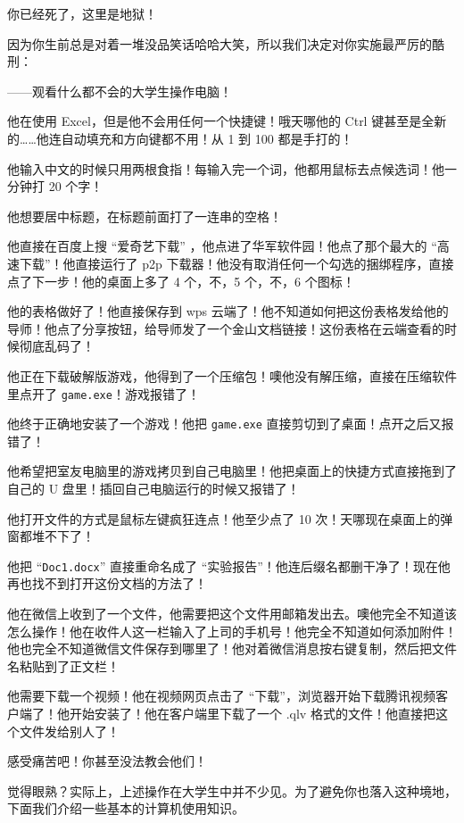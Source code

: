 \begin{tcolorbox}[title={作为引入的笑话}, enhanced, breakable, fontupper=\small,before upper={\setlength{\parindent}{2em}}]
  你已经死了，这里是地狱！

因为你生前总是对着一堆没品笑话哈哈大笑，所以我们决定对你实施最严厉的酷刑：

——观看什么都不会的大学生操作电脑！

他在使用 Excel，但是他不会用任何一个快捷键！哦天哪他的 Ctrl 键甚至是全新的……他连自动填充和方向键都不用！从 1 到 100 都是手打的！

他输入中文的时候只用两根食指！每输入完一个词，他都用鼠标去点候选词！他一分钟打 20 个字！

他想要居中标题，在标题前面打了一连串的空格！

他直接在百度上搜 “爱奇艺下载” ，他点进了华军软件园！他点了那个最大的 “高速下载”！他直接运行了 p2p 下载器！他没有取消任何一个勾选的捆绑程序，直接点了下一步！他的桌面上多了 4 个，不，5 个，不，6 个图标！

他的表格做好了！他直接保存到 wps 云端了！他不知道如何把这份表格发给他的导师！他点了分享按钮，给导师发了一个金山文档链接！这份表格在云端查看的时候彻底乱码了！

他正在下载破解版游戏，他得到了一个压缩包！噢他没有解压缩，直接在压缩软件里点开了 \texttt{game.exe}！游戏报错了！

他终于正确地安装了一个游戏！他把 \texttt{game.exe} 直接剪切到了桌面！点开之后又报错了！

他希望把室友电脑里的游戏拷贝到自己电脑里！他把桌面上的快捷方式直接拖到了自己的 U 盘里！插回自己电脑运行的时候又报错了！

他打开文件的方式是鼠标左键疯狂连点！他至少点了 10 次！天哪现在桌面上的弹窗都堆不下了！

他把 “\texttt{Doc1.docx}” 直接重命名成了 “实验报告”！他连后缀名都删干净了！现在他再也找不到打开这份文档的方法了！

他在微信上收到了一个文件，他需要把这个文件用邮箱发出去。噢他完全不知道该怎么操作！他在收件人这一栏输入了上司的手机号！他完全不知道如何添加附件！他也完全不知道微信文件保存到哪里了！他对着微信消息按右键复制，然后把文件名粘贴到了正文栏！

他需要下载一个视频！他在视频网页点击了 “下载”，浏览器开始下载腾讯视频客户端了！他开始安装了！他在客户端里下载了一个 .qlv 格式的文件！他直接把这个文件发给别人了！

感受痛苦吧！你甚至没法教会他们！
\end{tcolorbox}

觉得眼熟？实际上，上述操作在大学生中并不少见。为了避免你也落入这种境地，下面我们介绍一些基本的计算机使用知识。

